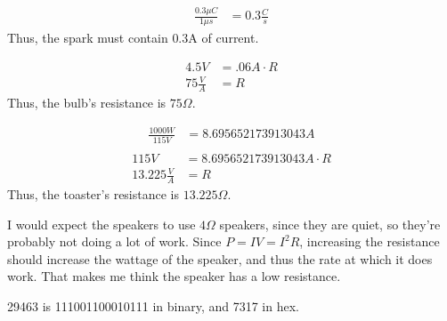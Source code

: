 \documentclass{article}
\begin{document}
\pagecolor{black}
\color{white}

\begin{align*}
    \frac{0.3\mu C}{1\mu s} &= 0.3 \frac Cs
\end{align*} Thus, the spark must contain $0.3$A of current.

\bigskip
{}
\begin{align*}
    4.5V &= .06A \cdot R \\
    75 \frac VA &= R
\end{align*} Thus, the bulb's resistance is $75 \Omega$.

\bigskip
{}
\begin{align*}
    \frac{1000 W}{115 V} &= 8.695652173913043A \\
\end{align*}
\begin{align*}
    115V &= 8.695652173913043A \cdot R \\
    13.225 \frac{V}{A} &= R
\end{align*} Thus, the toaster's resistance is $13.225\Omega$.

\bigskip
{}

    I would expect the speakers to use $4\Omega$ speakers, since they are quiet, so they're probably not doing a lot of work. Since $P= IV = I^2R$, increasing the resistance should increase the wattage of the speaker, and thus the rate at which it does work. That makes me think the speaker has a low resistance.

\bigskip
{}

\bigskip
{}

\bigskip
{}

\bigskip
{}

\bigskip
{}

    29463 is 111001100010111 in binary, and 7317 in hex.

\bigskip
{}
\end{document}
